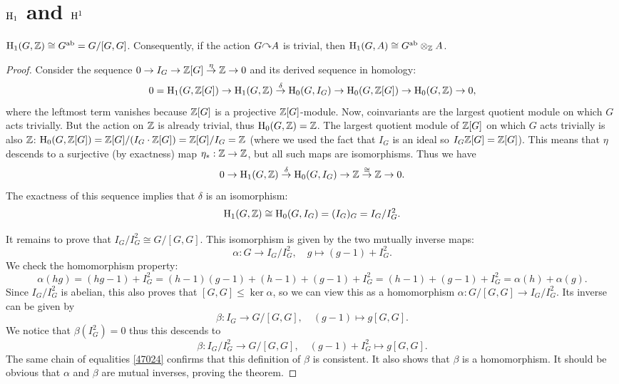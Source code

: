 \section{\texorpdfstring{$\mathrm{H}_1$}{H1} and \texorpdfstring{$\mathrm{H}^1$}{H1}}

\begin{thm}
    $\mathrm{H}_1(G,\mathbb{Z})\cong G^{\mathrm{ab}}=G\slash [G,G]$. Consequently, if the action $G\acts A$ is trivial, then $\mathrm{H}_1(G,A)\cong G^{\mathrm{ab}}\otimes_{\mathbb{Z}} A$.
\end{thm}
\begin{proof}
 Consider the sequence $0\to I_G\to \mathbb{Z}[G]\overset{\eta}{\to}\mathbb{Z}\to 0$ and its derived sequence in homology:
 \[0=\mathrm{H}_1(G,\mathbb{Z}[G])\to \mathrm{H}_1(G,\mathbb{Z})\overset{\delta}{\to}\mathrm{H}_0(G,I_G)\to \mathrm{H}_0(G,\mathbb{Z}[G])\to \mathrm{H}_0(G,\mathbb{Z})\to 0,\]
 where the leftmost term vanishes because $\mathbb{Z}[G]$ is a projective $\mathbb{Z}[G]$-module. Now, coinvariants are the largest quotient module on which $G$ acts trivially. But the action on $\mathbb{Z}$ is already trivial, thus $\mathrm{H}_0(G,\mathbb{Z})=\mathbb{Z}$. The largest quotient module of $\mathbb{Z}[G]$ on which $G$ acts trivially is also $\mathbb{Z}$: $\mathrm{H}_0(G,\mathbb{Z}[G])=\mathbb{Z}[G]\slash (I_G\cdot \mathbb{Z}[G])=\mathbb{Z}[G]\slash I_G=\mathbb{Z}$ (where we used the fact that $I_G$ is an ideal so $I_G\mathbb{Z}[G]=\mathbb{Z}[G]$). This means that $\eta$ descends to a surjective (by exactness) map $\eta_\ast:\mathbb{Z}\to \mathbb{Z}$, but all such maps are isomorphisms. Thus we have
 \[0\to \mathrm{H}_1(G,\mathbb{Z})\overset{\delta}{\to}\mathrm{H}_0(G,I_G)\to \mathbb{Z} \overset{\cong}{\to}\mathbb{Z}\to 0.\]
 The exactness of this sequence implies that $\delta$ is an isomorphism:
 \[\mathrm{H}_1(G,\mathbb{Z})\cong \mathrm{H}_0(G,I_G)=(I_G)_G=I_G\slash I_G^2.\]

 It remains to prove that $I_G\slash I_G^2\cong G\slash[G,G]$. This isomorphism is given by the two mutually inverse maps:
 \[\alpha:G\to I_G\slash I_G^2,\quad g\mapsto (g-1)+I_G^2.\]
 We check the homomorphism property:
 \[\alpha(hg)=(hg-1)+I_G^2=(h-1)(g-1)+(h-1)+(g-1)+I_G^2=(h-1)+(g-1)+I_G^2=\alpha(h)+\alpha(g).\label{47024}\]
 Since $I_G\slash I_G^2$ is abelian, this also proves that $[G,G]\leq \ker\alpha$, so we can view this as a homomorphism $\alpha:G\slash [G,G]\to I_G\slash I_G^2$. Its inverse can be given by
 \[\beta:I_G\to G\slash [G,G],\quad (g-1)\mapsto g[G,G].\]
 We notice that $\beta(I_G^2)=0$ thus this descends to 
\[\beta:I_G\slash I_G^2\to G\slash [G,G],\quad (g-1)+I_G^2\mapsto g[G,G].\]
The same chain of equalities  \eqref{47024} confirms that this definition of $\beta$ is consistent. It also shows that $\beta$ is a homomorphism. It should be obvious that $\alpha$ and $\beta$ are mutual inverses, proving the theorem.
\end{proof}

